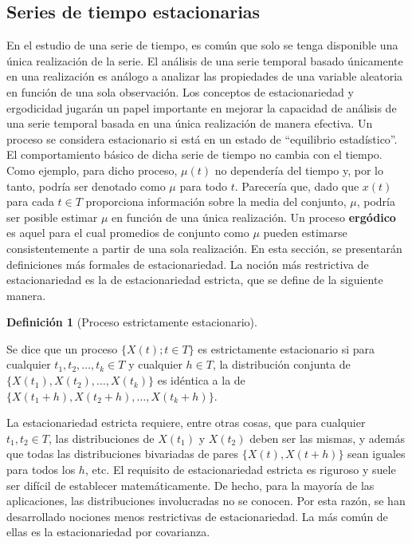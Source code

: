 \documentclass[
  us-letterpaper,
]{scrreprt}
\theoremstyle{plain}
\theoremstyle{definition}
\theoremstyle{plain}
\theoremstyle{definition}
\newtheorem{definition}{Definición}[chapter]
\theoremstyle{remark}
\begin{document}
\subsection{Series de tiempo
estacionarias}\label{series-de-tiempo-estacionarias}

En el estudio de una serie de tiempo, es común que solo se tenga
disponible una única realización de la serie. El análisis de una serie
temporal basado únicamente en una realización es análogo a analizar las
propiedades de una variable aleatoria en función de una sola
observación. Los conceptos de estacionariedad y ergodicidad jugarán un
papel importante en mejorar la capacidad de análisis de una serie
temporal basada en una única realización de manera efectiva. Un proceso
se considera estacionario si está en un estado de ``equilibrio
estadístico''. El comportamiento básico de dicha serie de tiempo no
cambia con el tiempo. Como ejemplo, para dicho proceso, \(\mu(t)\) no
dependería del tiempo y, por lo tanto, podría ser denotado como \(\mu\)
para todo \(t\). Parecería que, dado que \(x(t)\) para cada \(t\in T\)
proporciona información sobre la media del conjunto, \(\mu\), podría ser
posible estimar \(\mu\) en función de una única realización. Un proceso
\textbf{ergódico} es aquel para el cual promedios de conjunto como
\(\mu\) pueden estimarse consistentemente a partir de una sola
realización. En esta sección, se presentarán definiciones más formales
de estacionariedad. La noción más restrictiva de estacionariedad es la
de estacionariedad estricta, que se define de la siguiente manera.

\begin{definition}[Proceso estrictamente
estacionario]\protect\hypertarget{def-PPE}{}\label{def-PPE}

Se dice que un proceso \(\{X(t); t \in T\}\) es estrictamente
estacionario si para cualquier \(t_1, t_2,\ldots, t_k \in T\) y
cualquier \(h \in T\), la distribución conjunta de
\(\{X(t_1), X(t_2),\ldots , X(t_k)\}\) es idéntica a la de
\(\{X(t_1 + h), X(t_2 + h),\ldots, X(t_k + h)\}\).

\end{definition}

La estacionariedad estricta requiere, entre otras cosas, que para
cualquier \(t_1, t_2 \in T\), las distribuciones de \(X(t_1)\) y
\(X(t_2)\) deben ser las mismas, y además que todas las distribuciones
bivariadas de pares \(\{X(t), X(t + h)\}\) sean iguales para todos los
\(h\), etc. El requisito de estacionariedad estricta es riguroso y suele
ser difícil de establecer matemáticamente. De hecho, para la mayoría de
las aplicaciones, las distribuciones involucradas no se conocen. Por
esta razón, se han desarrollado nociones menos restrictivas de
estacionariedad. La más común de ellas es la estacionariedad por
covarianza.
\end{document}
